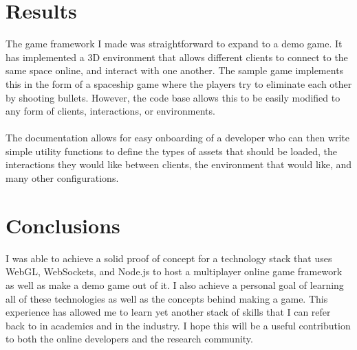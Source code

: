 \documentclass{acmsiggraph}
\begin{document}
\section{Results}
    The game framework I made was straightforward to expand to a demo game. It has implemented a 3D environment that allows different clients to connect to the same space online, and interact with one another. The sample game implements this in the form of a spaceship game where the players try to eliminate each other by shooting bullets. However, the code base allows this to be easily modified to any form of clients, interactions, or environments. \\\\
    The documentation allows for easy onboarding of a developer who can then write simple utility functions to define the types of assets that should be loaded, the interactions they would like between clients, the environment that would like, and many other configurations.

\section{Conclusions}
    I was able to achieve a solid proof of concept for a technology stack that uses WebGL, WebSockets, and Node.js to host a multiplayer online game framework as well as make a demo game out of it. I also achieve a personal goal of learning all of these technologies as well as the concepts behind making a game. This experience has allowed me to learn yet another stack of skills that I can refer back to in academics and in the industry. I hope this will be a useful contribution to both the online developers and the research community.
\end{document}
